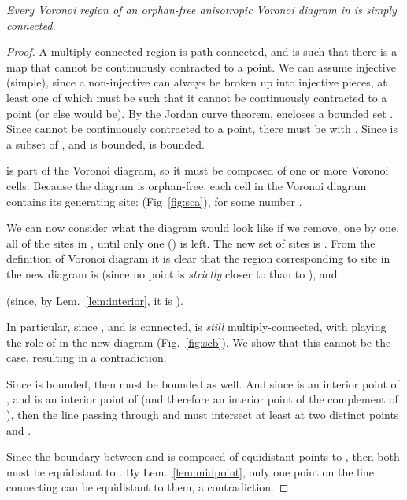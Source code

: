 \documentclass[11pt]{article}
\begin{document}
\emph{Every Voronoi region of an orphan-free anisotropic Voronoi diagram in 
 is simply connected. 
}
\begin{proof}	
A multiply connected region  is path connected, and is
such that there is a map
 that cannot be continuously contracted to a point. We
can assume  injective (simple), since a non-injective  can always be broken up
into injective pieces, at least one of which must be such that it cannot be
continuously contracted to a point (or else  would be). 
By the Jordan curve theorem,  encloses a bounded set . Since 
cannot be continuously contracted to a point, there must be
 with . Since  is a subset of , 
and  is bounded,  is bounded. 





 is part of the Voronoi diagram, so it must be composed of one or more
Voronoi cells. Because the diagram is orphan-free, each cell in the Voronoi
diagram contains its generating site: 
(Fig~\ref{fig:sca}), for some number . 


We can now consider what the diagram would look like if we remove, one by
one, all of the sites  in , until only
one () is left.
The new set of sites is . 
	From the definition of Voronoi diagram it is clear that 
	the region corresponding to site  in the new diagram is 
(since no point is \emph{strictly} closer to  than to ), and

(since, by Lem.~\ref{lem:interior}, it is ). 


In particular, since , and  is connected, 
 is \emph{still} multiply-connected,
with  playing the role of  in the new diagram (Fig.~\ref{fig:scb}). 
We show that this cannot be the case, resulting in a contradiction. 

Since  is bounded, then  must be bounded as well. 
And since  is an interior point of , and  is 
an interior point of  (and therefore an interior point of the complement of ), 
then the line passing through  and  must intersect  at
least at two distinct points  and . 


Since the boundary between  and  is composed of
equidistant points to , then both  must be equidistant to . 
By Lem.~\ref{lem:midpoint}, only one point on the line connecting  can be equidistant to them, a contradiction. 




\end{proof}
\end{document}
